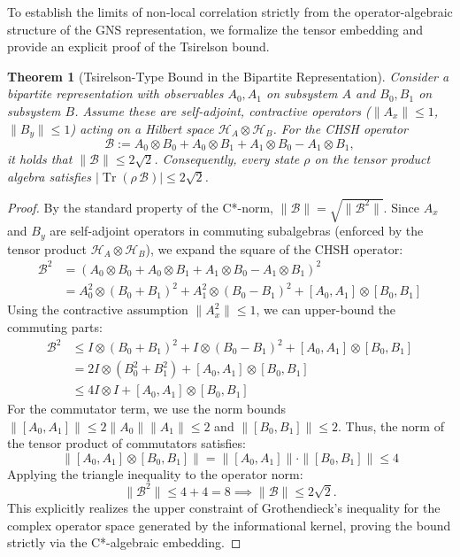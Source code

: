 \documentclass[11pt, a4paper]{article}
\newtheorem{theorem}{Theorem}
\begin{document}
To establish the limits of non-local correlation strictly from the operator-algebraic structure of the GNS representation, we formalize the tensor embedding and provide an explicit proof of the Tsirelson bound.

\begin{theorem}[Tsirelson-Type Bound in the Bipartite Representation]
Consider a bipartite representation with observables $A_0,A_1$ on subsystem $A$ and $B_0,B_1$ on subsystem $B$. Assume these are self-adjoint, contractive operators ($\|A_x\|\le 1$, $\|B_y\|\le 1$) acting on a Hilbert space $\mathcal{H}_A \otimes \mathcal{H}_B$. For the CHSH operator
\begin{equation}
\mathcal{B} := A_0\otimes B_0 + A_0\otimes B_1 + A_1\otimes B_0 - A_1\otimes B_1,
\end{equation}
it holds that $\|\mathcal{B}\| \le 2\sqrt{2}$. Consequently, every state $\rho$ on the tensor product algebra satisfies $|\operatorname{Tr}(\rho\,\mathcal{B})| \le 2\sqrt{2}$.
\end{theorem}

\begin{proof}
By the standard property of the C*-norm, $\|\mathcal{B}\| = \sqrt{\|\mathcal{B}^2\|}$. Since $A_x$ and $B_y$ are self-adjoint operators in commuting subalgebras (enforced by the tensor product $\mathcal{H}_A \otimes \mathcal{H}_B$), we expand the square of the CHSH operator:
\begin{align*}
\mathcal{B}^2 &= (A_0 \otimes B_0 + A_0 \otimes B_1 + A_1 \otimes B_0 - A_1 \otimes B_1)^2 \\
&= A_0^2 \otimes (B_0 + B_1)^2 + A_1^2 \otimes (B_0 - B_1)^2 + [A_0, A_1] \otimes [B_0, B_1]
\end{align*}
Using the contractive assumption $\|A_x^2\| \le 1$, we can upper-bound the commuting parts:
\begin{align*}
\mathcal{B}^2 &\le I \otimes (B_0 + B_1)^2 + I \otimes (B_0 - B_1)^2 + [A_0, A_1] \otimes [B_0, B_1] \\
&= 2I \otimes (B_0^2 + B_1^2) + [A_0, A_1] \otimes [B_0, B_1] \\
&\le 4I \otimes I + [A_0, A_1] \otimes [B_0, B_1]
\end{align*}
For the commutator term, we use the norm bounds $\|[A_0, A_1]\| \le 2\|A_0\|\|A_1\| \le 2$ and $\|[B_0, B_1]\| \le 2$. Thus, the norm of the tensor product of commutators satisfies:
\begin{equation}
\| [A_0, A_1] \otimes [B_0, B_1] \| = \|[A_0, A_1]\| \cdot \|[B_0, B_1]\| \le 4
\end{equation}
Applying the triangle inequality to the operator norm:
\begin{equation}
\|\mathcal{B}^2\| \le 4 + 4 = 8 \implies \|\mathcal{B}\| \le 2\sqrt{2}.
\end{equation}
This explicitly realizes the upper constraint of Grothendieck's inequality for the complex operator space generated by the informational kernel, proving the bound strictly via the C*-algebraic embedding.
\end{proof}
\end{document}
